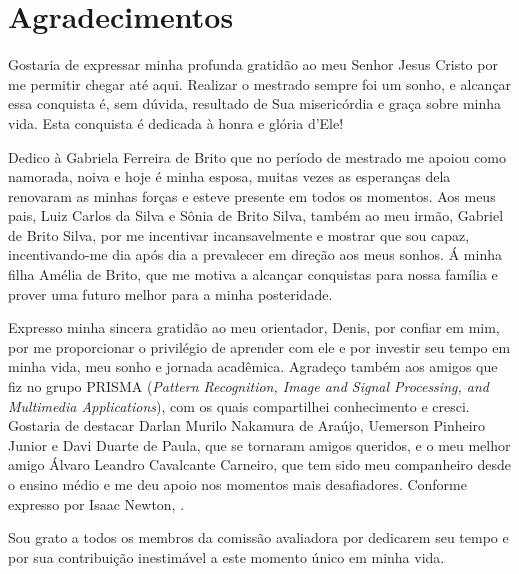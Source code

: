 \newpage
\thispagestyle{empty}
\section*{Agradecimentos}
Gostaria de expressar minha profunda gratidão ao meu Senhor Jesus Cristo por me permitir chegar até aqui. Realizar o mestrado sempre foi um sonho, e alcançar essa conquista é, sem dúvida, resultado de Sua misericórdia e graça sobre minha vida. Esta conquista é dedicada à honra e glória d'Ele!

Dedico à Gabriela Ferreira de Brito que no período de mestrado me apoiou como namorada, noiva e hoje é minha esposa, muitas vezes as esperanças dela renovaram as minhas forças e esteve presente em todos os momentos. Aos meus pais, Luiz Carlos da Silva e Sônia de Brito Silva, também ao meu irmão, Gabriel de Brito Silva, por me incentivar incansavelmente e mostrar que sou capaz, incentivando-me dia após dia a prevalecer em direção aos meus sonhos. Á minha filha Amélia de Brito, que me motiva a alcançar conquistas para nossa família e prover uma futuro melhor para a minha posteridade.

Expresso minha sincera gratidão ao meu orientador, Denis, por confiar em mim, por me proporcionar o privilégio de aprender com ele e por investir seu tempo em minha vida, meu sonho e jornada acadêmica. Agradeço também aos amigos que fiz no grupo PRISMA (\textit{Pattern Recognition, Image and Signal Processing, and Multimedia Applications}), com os quais compartilhei conhecimento e cresci. Gostaria de destacar Darlan Murilo Nakamura de Araújo, Uemerson Pinheiro Junior e Davi Duarte de Paula, que se tornaram amigos queridos, e o meu melhor amigo Álvaro Leandro Cavalcante Carneiro, que tem sido meu companheiro desde o ensino médio e me deu apoio nos momentos mais desafiadores. Conforme expresso por Isaac Newton, .

Sou grato a todos os membros da comissão avaliadora por dedicarem seu tempo e por sua contribuição inestimável a este momento único em minha vida.